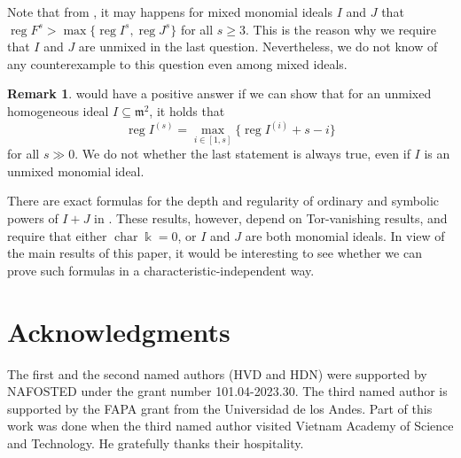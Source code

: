 \documentclass{amsart}
\DeclareMathOperator{\chara}{char}
\DeclareMathOperator{\reg}{reg}
\newcommand{\mm}{\mathfrak{m}}
\theoremstyle{plain}
\theoremstyle{definition}
\newtheorem{rem}[thm]{Remark}
\numberwithin{equation}{section}
\newcommand{\kk}{\Bbbk}
\begin{document}
Note that from \cite[Remark 5.7]{NgV19b}, it may happens for mixed monomial ideals $I$ and $J$ that $\reg F^s > \max\{\reg I^s, \reg J^s\}$ for all $s\ge 3$. This is the reason why we require that $I$ and $J$ are unmixed in the last question. Nevertheless, we do not know of any counterexample to this question even among mixed ideals.
\begin{rem}
 would have a positive answer if we can show that for an unmixed homogeneous ideal $I\subseteq \mm^2$, it holds that
\[
\reg I^{(s)}=\max\limits_{i\in [1,s]}\{\reg I^{(i)}+s-i\}
\]
for all $s\gg 0$. We do not whether the last statement is always true, even if $I$ is an unmixed monomial ideal.
\end{rem}
There are exact formulas for the depth and regularity of ordinary and symbolic powers of $I+J$ in \cite{HNTT, HJKN, NgV19a}. These results, however, depend on Tor-vanishing results, and require that either $\chara \kk=0$, or $I$ and $J$ are both monomial ideals. In view of the main results of this paper, it would be interesting to see whether we can prove such formulas in a characteristic-independent way.




\section*{Acknowledgments}
The first and the second named authors (HVD and HDN) were supported by NAFOSTED under the grant number 101.04-2023.30. The third named author is supported by the FAPA grant from the Universidad de los Andes. Part of this work was done when the third named author visited Vietnam Academy of Science and Technology. He gratefully thanks their hospitality.

\end{document}
